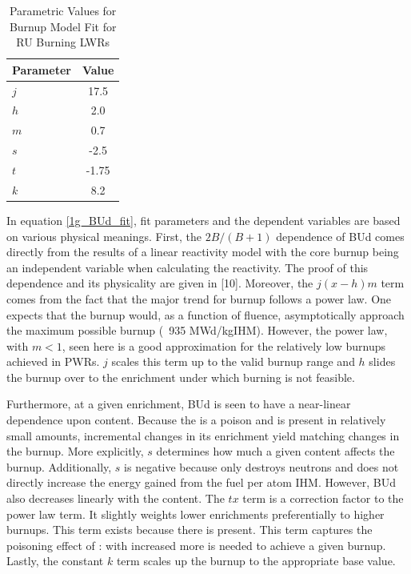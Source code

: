 \begin{table}[htbp]
\begin{center}
\caption{Parametric Values for Burnup Model Fit for RU Burning LWRs}
\label{1g_table4}
\begin{tabular}{|l|c|}
\hline
\textbf{Parameter} & \textbf{Value} \\
\hline
$j$ & 17.5 \\
$h$ & 2.0 \\
$m$ & 0.7 \\
$s$ & -2.5 \\
$t$ & -1.75 \\
$k$ & 8.2 \\
\hline
\end{tabular}
\end{center}
\end{table}

In equation \ref{1g_BUd_fit}, fit parameters and the dependent variables are based on various 
physical meanings.  First, the $2B/(B+1)$ dependence of BUd comes directly from the results of a 
linear reactivity model with the core burnup being an independent variable when calculating the 
reactivity.  The proof of this dependence and its physicality are given in [10]. Moreover, the 
$j(x-h)m$ term comes from the fact that the major trend for burnup follows a power law. One 
expects that the burnup would, as a function of fluence, asymptotically approach the maximum 
possible burnup (~935 MWd/kgIHM).  However, the power law, with $m<1$, seen here is a good 
approximation for the relatively low burnups achieved in PWRs.  $j$ scales this term up to 
the valid burnup range and $h$ slides the burnup over to the  enrichment under 
which burning is not feasible.

Furthermore, at a given  enrichment, BUd is seen to have a near-linear dependence upon 
 content.  Because the  is a poison and is present in relatively small amounts, 
incremental changes in its enrichment yield matching changes in the burnup.  More explicitly, 
$s$ determines how much a given  content affects the burnup.  Additionally, $s$ is negative 
because  only destroys neutrons and does not directly increase the energy gained from the 
fuel per atom IHM.  However, BUd also decreases linearly with the  content.  The $tx$ term 
is a correction factor to the power law term.  It slightly weights lower  enrichments 
preferentially to higher burnups.  This term exists because there is  present.  This term 
captures the poisoning effect of : with increased  more  is needed 
to achieve a given burnup.  Lastly, the constant $k$ term scales up the burnup to the appropriate base value.


